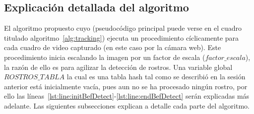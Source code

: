 \documentclass[a4paper,openright,12pt]{report}
\begin{document}
\subsection{Explicación detallada del algoritmo}
El algoritmo propuesto cuyo (pseudocódigo principal puede verse en el cuadro
titulado algoritmo~\ref{alg:tracking}) ejecuta un procedimiento cíclicamente
para cada cuadro de video capturado (en este caso por la cámara web). Este
procedimiento inicia escalando la imagen por un factor de escala
($factor\_escala$), la razón de ello es para agilizar la detección de rostros.
Una variable global $ROSTROS\_TABLA$ la cual es una tabla hash tal como se
describió en la sesión anterior está inicialmente vacía, pues aun no se ha
procesado ningún rostro, por ello las
líneas~\ref{lst:line:initBefDetect}-\ref{lst:line:endBefDetect} serán
explicadas más adelante. Las siguientes subsecciones explican a detalle cada
parte del algoritmo.\\
\end{document}
